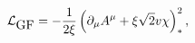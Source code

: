 \begin{equation}
{\cal{L}}_{\mbox{GF}} = - \frac{1}{2\xi} \left(\partial_{\mu} A^{\mu}
+ \xi \sqrt{2}v \chi\right)_{\ast}^2,
\end{equation}

